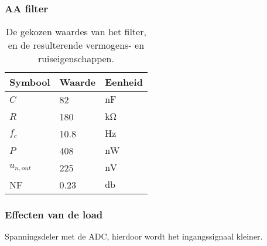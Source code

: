     \begin{frame}
        \frametitle{AA filter}
    
        \begin{table}[ht]
            \centering
            \begin{tabular}{l|l|l}
                Symbool & Waarde & Eenheid \\
                \hline
                $C$         & 82    & $\si{\nano\farad}$\\
                $R$         & 180   & $\si{\kilo\ohm}$  \\
                $f_c$       & 10.8  & $\si{\hertz}$     \\
                $P$         & 408   & $\si{\nano\watt}$ \\
                $u_{n,out}$ & 225   & $\si{\nano\volt}$ \\
                NF          & 0.23  & $\si{\decibel}$   \\
            \end{tabular}
            \caption{De gekozen waardes van het filter, en de resulterende vermogens- en ruiseigenschappen.}
            \label{tab:filterValues}
        \end{table}
    
    \end{frame}
    \begin{frame}
        \frametitle{Effecten van de load}
    
        Spanningsdeler met de ADC, hierdoor wordt het ingangssignaal kleiner.
    
    \end{frame}

